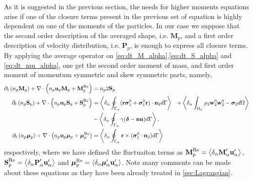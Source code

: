 As it is suggested in the previous section, the needs for higher moments equations arise if one of the closure terms present in the previous set of equation is highly dependent on one of the moments of the particles. 
In our case we suppose that the second order description of the averaged shape, i.e. $\textbf{M}_p$, and a first order description of velocity distribution, i.e. $\textbf{P}_p$,  is enough to express all closure terms. 
By applying the average operator on \ref{eq:dt_M_alpha},\ref{eq:dt_S_alpha} and \ref{eq:dt_mu_alpha}, one get the second order moment of mass, and first order moment of momentum symmetric and skew symmetric parts, namely, 
\begin{align}
    \partial_t \left(n_p \textbf{M}_p\right)
    + \mathbf{\nabla}\cdot \left(
        n_p \textbf{u}_p \textbf{M}_p
    + \textbf{M}_p^\text{Re}
    \right)
    &=
    n_p2  \textbf{S}_p
    \label{eq:dt_hybrid_Mp}
    \\
\label{eq:dt_hybrid_Sp}
\partial_t \left(n_p \textbf{S}_p\right)
+ \mathbf{\nabla}\cdot \left(
    n_p \textbf{u}_p \textbf{S}_p
+ \textbf{S}_p^\text{Re}
\right)
&=
\left<\delta_\alpha \oint_{\Gamma_\alpha} (\textbf{r}\bm\sigma_1^0+\bm\sigma_1^0\textbf{r})\cdot \textbf{n}_2 d\Gamma\right>
&+ \left<\delta_\alpha \int_{\Omega_\alpha} 
    \rho_2 \textbf{w}_2^0  \textbf{w}_2^0 
    - \bm{\sigma}_2
 d\Omega\right>\\
&-  \left<\delta_\alpha \oint_{\Gamma_\alpha} \gamma (\bm\delta - \textbf{nn}) d\Gamma\right>,
\\
\label{eq:dt_hybrid_mup}
\partial_t \left(n_p \bm{\mu}_p\right)
+ \mathbf{\nabla}\cdot \left(
n_p \textbf{u}_p \bm{\mu}_p
+ \bm{\mu}_p^\text{Re}
\right)
&=
\left<\delta_\alpha \oint_{\Gamma_\alpha} \textbf{r}\times(\bm\sigma_1^0\cdot \textbf{n}_2) d\Gamma\right>
\end{align}
respectively, where we have defined the fluctuaiton terms as $
 \textbf{M}_p^\text{Re}
 = \left<\delta_\alpha \textbf{M}_\alpha' \textbf{u}_\alpha'\right> $,  $ 
 \textbf{S}_p^\text{Re}
 = \left<\delta_\alpha \textbf{P}_\alpha' \textbf{u}_\alpha'\right>$ and $ 
 \bm{\mu}_p^\text{Re}
 = \left<\delta_\alpha \bm{\mu}_\alpha' \textbf{u}_\alpha'\right>
$.
Note many comments can be made about these equations as they have been already treated in \ref{sec:Lagrangian}. 
